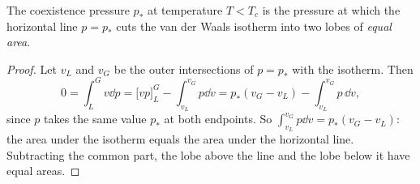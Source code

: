 \documentclass[a4paper]{scrartcl}
\begin{document}
\begin{proposition}
	The coexistence pressure $p_*$ at temperature $T < T_c$ is the pressure at which the horizontal line $p = p_*$ cuts the van der Waals isotherm into two lobes of \emph{equal area}.
\end{proposition}
\begin{proof}
	Let $v_L$ and $v_G$ be the outer intersections of $p = p_*$ with the isotherm. Then
	$$
	0 = \int_L^G v\dd p = \big[vp\big]_L^G - \int_{v_L}^{v_G}p\dd v = p_*(v_G - v_L) - \int_{v_L}^{v_G}p\,\dd v,
	$$
	since $p$ takes the same value $p_*$ at both endpoints. So $\int_{v_L}^{v_G}p\dd v = p_*(v_G-v_L)$: the area under the isotherm equals the area under the horizontal line. Subtracting the common part, the lobe above the line and the lobe below it have equal areas.
\end{proof}
\end{document}
